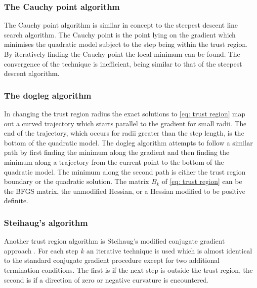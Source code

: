 \subsubsection{The Cauchy point algorithm}

The Cauchy point algorithm is similar in concept to the steepest descent line search algorithm.
The Cauchy point is the point lying on the gradient which minimises the quadratic model subject to the step being within the trust region.
By iteratively finding the Cauchy point the local minimum can be found.
The convergence of the technique is inefficient, being similar to that of the steepest descent algorithm.


\subsubsection{The dogleg algorithm}

In changing the trust region radius the exact solutions to \eqref{eq: trust region} map out a curved trajectory which starts parallel to the gradient for small radii.
The end of the trajectory, which occurs for radii greater than the step length, is the bottom of the quadratic model.
The dogleg algorithm attempts to follow a similar path by first finding the minimum along the gradient and then finding the minimum along a trajectory from the current point to the bottom of the quadratic model.
The minimum along the second path is either the trust region boundary or the quadratic solution.
The matrix $B_k$ of \eqref{eq: trust region} can be the BFGS matrix, the unmodified Hessian, or a Hessian modified to be positive definite.


\subsubsection{Steihaug's algorithm}

Another trust region algorithm is Steihaug's modified conjugate gradient approach \citep{Steihaug83}.
For each step $k$ an iterative technique is used which is almost identical to the standard conjugate gradient procedure except for two additional termination conditions.
The first is if the next step is outside the trust region, the second is if a direction of zero or negative curvature is encountered.


